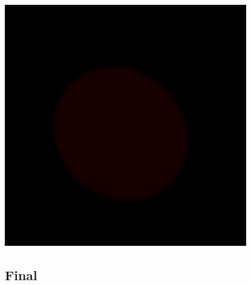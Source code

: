 \documentclass[a4paper]{article}
\begin{document}
\begin{center}
	\includegraphics[scale=1.00]{images/gallery/ray_casting.png}
	\label{fig:ray_projection}
\end{center}


\subsection{Final}
\end{document}
